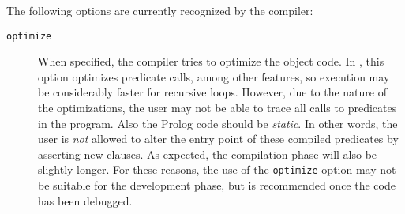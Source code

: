 The following options are currently recognized by the compiler:
\begin{description}
\item[{\tt optimize}]
	When specified, the compiler tries to optimize the object code.
	In \version, this option optimizes predicate calls, among other
	features, so execution may be considerably faster for recursive
	loops.  However,
	due to the nature of the optimizations, the user may not be able to
	trace all calls to predicates in the program.  Also the Prolog code
	should be {\em static}.  In other words, the user is {\em not} allowed
	to alter the entry point of these compiled predicates by asserting new
	clauses.  As expected, the compilation phase will also be slightly
	longer.  For these reasons, the use of the {\tt optimize} option may
	not be suitable for the development phase, but is
	recommended once the code has been debugged.


\end{description}
